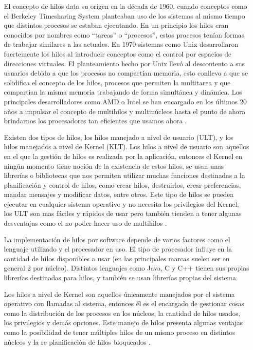 \documentclass[12pt]{article}
\begin{document}
El concepto de hilos data su origen en la década de 1960, cuando conceptos como el Berkeley Timesharing System planteaban uso de los sistemas al mismo tiempo que distintos procesos se estaban ejecutando. En un principio los hilos eran conocidos por nombres como “tareas” o “procesos”, estos procesos tenían formas de trabajar similares a las actuales. En 1970 sistemas como Unix desarrollaron fuertemente los hilos al introducir conceptos como el control por espacios de direcciones virtuales. El planteamiento hecho por Unix llevó al descontento a sus usuarios debido a que los procesos no compartían memoria, esto conllevo a que se solidifica el concepto de los hilos, procesos que permiten la multitarea y que compartían la misma memoria trabajando de forma simultánea y dinámica. Los principales desarrolladores como AMD o Intel se han encargado en los últimos 20 años a impulsar el concepto de multihilos y multinúcleos hasta el punto de ahora brindarnos los procesadores tan eficientes que usamos ahora \cite{O'Sullivan2005}.

Existen dos tipos de hilos, los hilos manejado a nivel de usuario (ULT), y los hilos manejados a nivel de Kernel (KLT).
Los hilos a nivel de usuario son aquellos en el que la gestión de hilos es realizada por la aplicación, entonces el Kernel en ningún momento tiene noción de la existencia de estos  hilos, se usan unas librerías o bibliotecas que nos permiten utilizar muchas funciones destinadas a la planificación y control de hilos, como crear hilos, destruirlos, crear preferencias, mandar mensajes y modificar datos, entre otros. Este tipo de hilos se pueden ejecutar en cualquier sistema operativo y no necesita los privilegios del Kernel, los ULT son mas fáciles y rápidos de usar pero también tienden a tener algunas desventajas como el no poder hacer uso de multihilos \cite{Tipos}.

La implementación de hilos por software depende de varios factores como el lenguaje utilizado y el procesador en uso. El tipo de procesador influye en la cantidad de hilos disponibles a usar (en las principales marcas suelen ser en general 2 por núcleo). Distintos lenguajes como Java, C y C++ tienen sus propias librerías  destinadas para hilos, y también se usan librerías propias del sistema.

Los hilos a nivel de Kernel son aquellos únicamente manejados por el sistema operativo con llamadas al sistema, entonces él es el encargado de gestionar cosas como la distribución de los procesos en los núcleos,  la cantidad de hilos usados, los privilegios y demás opciones. Este manejo de hilos presenta algunas ventajas como la posibilidad de tener múltiples hilos de un mismo proceso en distintos núcleos y la re planificación de hilos bloqueados \cite{Tipos}.
\end{document}
